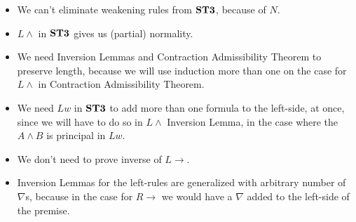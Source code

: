 \documentclass[a4paper, 12pt]{paper}
\begin{document}
\begin{itemize}
  \item We can't eliminate weakening rules from $\mathbf{ST3}$, because of $N$.

  \item $L \wedge$ in $\mathbf{ST3}$ gives us (partial) normality.
  
  \item We need Inversion Lemmas and Contraction Admissibility Theorem to preserve length, because we will use induction more than one on the case for $L \wedge$ in Contraction Admissibility Theorem.
  
  \item We need $Lw$ in $\mathbf{ST3}$ to add more than one formula to the left-side, at once, since we will have to do so in $L \wedge$ Inversion Lemma, in the case where the $A \wedge B$ is principal in $Lw$.
  
  \item We don't need to prove inverse of $L \rightarrow$.

  \item Inversion Lemmas for the left-rules are generalized with arbitrary number of $\nabla$s, because in the case for $R \rightarrow$ we would have a $\nabla$ added to the left-side of the premise.
  
\end{itemize}
\end{document}
